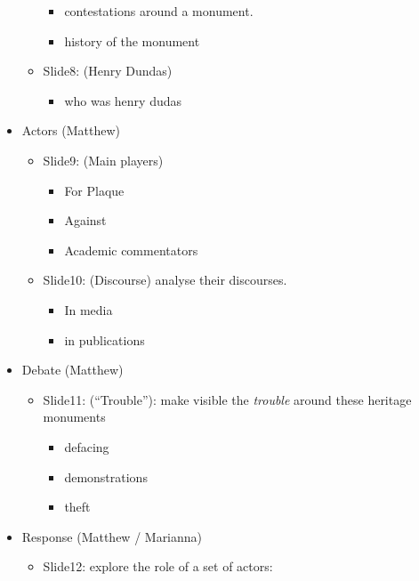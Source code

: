 \documentclass{scrartcl}
\begin{document}
\begin{itemize}
\begin{itemize}
\begin{itemize}
            \item contestations around a monument.
            \item history of the monument
        \end{itemize}
    \end{itemize}
    \begin{itemize}
        \item Slide8: (Henry Dundas)
        \begin{itemize}
            \item who was henry dudas
        \end{itemize}
    \end{itemize}
    \item Actors (Matthew)
    \begin{itemize}
        \item Slide9: (Main players)
        \begin{itemize}
            \item For Plaque
            \item Against
            \item Academic commentators
        \end{itemize}
        \item Slide10: (Discourse) analyse their discourses. 
        \begin{itemize}
            \item In media
            \item in publications
        \end{itemize}
    \end{itemize}
    \item Debate (Matthew)
    \begin{itemize}
        \item Slide11: (``Trouble''): make visible the \textit{trouble} around these heritage monuments
        \begin{itemize}
            \item defacing
            \item demonstrations
            \item theft
        \end{itemize}
    \end{itemize}
    \item Response (Matthew / Marianna)
    \begin{itemize}
        \item Slide12: explore the role of a set of actors:
        \begin{itemize}

\end{itemize}
\end{itemize}
\end{itemize}
\end{document}
